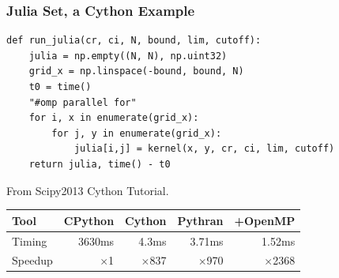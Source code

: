 \documentclass[aspectratio=1610]{beamer}
\begin{document}
\begin{frame}[fragile]
    \frametitle{Julia Set, a Cython Example}

\begin{lstlisting}
def run_julia(cr, ci, N, bound, lim, cutoff):
    julia = np.empty((N, N), np.uint32)
    grid_x = np.linspace(-bound, bound, N)
    t0 = time()
    "#omp parallel for"
    for i, x in enumerate(grid_x):
        for j, y in enumerate(grid_x):
            julia[i,j] = kernel(x, y, cr, ci, lim, cutoff)
    return julia, time() - t0
\end{lstlisting}
From Scipy2013 Cython Tutorial.
\vfill
    \begin{tabular}{|l|r|r|r|r|}
        \hline
        Tool    &  CPython    &  Cython  &  Pythran & +OpenMP   \\
        \hline
        Timing  &  3630ms    &   4.3ms  &   3.71ms  & 1.52ms  \\
        \hline
        Speedup & $\times$1 &  $\times$837 &  $\times$970 & $\times$2368   \\
        \hline
    \end{tabular}

\end{frame}
\end{document}
